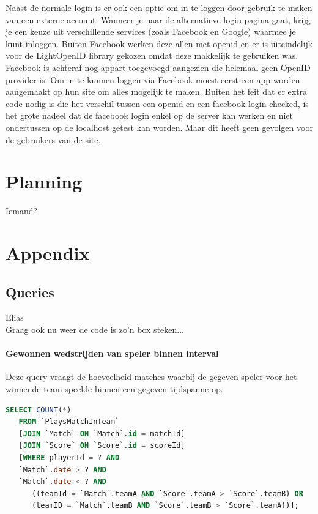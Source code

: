 \documentclass[11pt]{article}
\begin{document}
Naast de normale login is er ook een optie om in te loggen door gebruik te maken van een externe account. Wanneer je naar de alternatieve login pagina gaat, krijg je een keuze uit verschillende services (zoals Facebook en Google) waarmee je kunt inloggen. Buiten Facebook werken deze allen met openid en er is uiteindelijk voor de LightOpenID library gekozen omdat deze makkelijk te gebruiken was. Facebook is achteraf nog appart toegevoegd aangezien die helemaal geen OpenID provider is. Om in te kunnen loggen via Facebook moest eerst een app worden aangemaakt op hun site om alles mogelijk te maken. Buiten het feit dat er extra code nodig is die het verschil tussen een openid en een facebook login checked, is het grote nadeel dat de facebook login enkel op de server kan werken en niet ondertussen op de localhost getest kan worden. Maar dit heeft geen gevolgen voor de gebruikers van de site.




\section{Planning}


Iemand?



\section{Appendix}

\subsection{Queries}

Elias\\
Graag ook nu weer de code is zo'n box steken...


\paragraph{Gewonnen wedstrijden van speler binnen interval}

  Deze query vraagt de hoeveelheid matches waarbij de gegeven speler voor het winnende team speelde binnen een gegeven tijdspanne op.

  \begin{framed}
  \begin{lstlisting}[language=sql]
  SELECT COUNT(*)
   FROM `PlaysMatchInTeam`
   [JOIN `Match` ON `Match`.id = matchId]
   [JOIN `Score` ON `Score`.id = scoreId]
   [WHERE playerId = ? AND
   `Match`.date > ? AND
   `Match`.date < ? AND
      ((teamId = `Match`.teamA AND `Score`.teamA > `Score`.teamB) OR
      (teamID = `Match`.teamB AND `Score`.teamB > `Score`.teamA))];
  \end{lstlisting}
  \end{framed}
\end{document}
